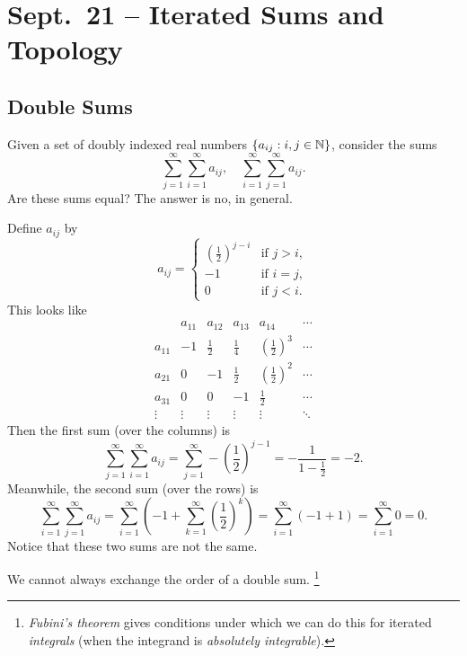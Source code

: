\chapter{Sept.~21 -- Iterated Sums and Topology}

\section{Double Sums}
Given a set of doubly indexed real numbers
$\{a_{ij} : i, j \in \mathbb{N}\}$, consider the
sums
\[
  \sum_{j = 1}^\infty \sum_{i = 1}^\infty a_{ij}, \quad
  \sum_{i = 1}^\infty \sum_{j = 1}^\infty a_{ij}.
\]
Are these sums equal? The answer is no, in general.

\begin{example}
  Define $a_{ij}$ by
  \[
    a_{ij} = \begin{cases}
      \left(\frac{1}{2}\right)^{j - i} & \text{if $j > i$}, \\
      -1 & \text{if $i = j$}, \\
      0 & \text{if $j < i$}.
    \end{cases}
  \]
  This looks like
  \[
    \begin{array}{c|ccccc}
      & a_{11} & a_{12} & a_{13} & a_{14} & \cdots \\
      \hline
      a_{11} & -1 & \frac{1}{2} & \frac{1}{4} & \left(\frac{1}{2}\right)^3 & \cdots \\
      a_{21} & 0 & -1 & \frac{1}{2} & \left(\frac{1}{2}\right)^2 & \cdots \\
      a_{31} & 0 & 0 & -1 & \frac{1}{2} & \cdots \\
      \vdots & \vdots & \vdots & \vdots & \vdots & \ddots
    \end{array}
  \]
  Then the first sum (over the columns) is
  \[
    \sum_{j = 1}^\infty \sum_{i = 1}^\infty a_{ij}
    = \sum_{j = 1}^\infty -\left(\frac{1}{2}\right)^{j - 1}
    = -\frac{1}{1 - \frac{1}{2}} = -2
  .\]
  Meanwhile, the second sum (over the rows) is
  \[
    \sum_{i = 1}^\infty \sum_{j = 1}^\infty a_{ij}
    = \sum_{i = 1}^\infty \left(-1 + \sum_{k = 1}^\infty \left(\frac{1}{2}\right)^{k}\right)
    = \sum_{i = 1}^\infty \left(-1 + 1\right)
    = \sum_{i = 1}^\infty 0 = 0
  .\]
  Notice that these two sums are not the same.
\end{example}

\begin{remark}
  We cannot always exchange the order of a double
  sum.
  \footnote{\textit{Fubini's theorem} gives conditions under which we can do this for iterated \textit{integrals} (when the integrand is \textit{absolutely integrable}).}
\end{remark}

